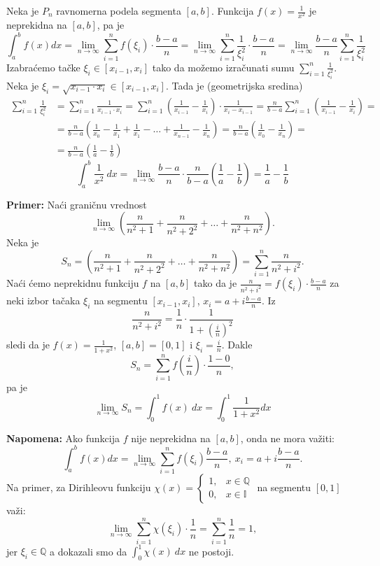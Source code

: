 \documentclass[a4paper,12pt,twoside]{report}
\numberwithin{algorithm}{section}
\begin{document}
Neka je \(P_n\) ravnomerna podela segmenta \([a, b]\).
Funkcija \(f(x) = \frac{1}{x^2}\) je neprekidna na \([a, b]\), pa je
\[
    \int_a^b f(x) dx = \lim_{n \to \infty} \sum_{i=1}^n f(\xi_i) \cdot \frac{b-a}{n} = \lim_{n \to \infty} \sum_{i=1}^n \frac{1}{\xi_i^2} \cdot \frac{b-a}{n} = \lim_{n \to \infty} \frac{b-a}{n} \sum_{i=1}^n \frac{1}{\xi_i^2}
\]
Izabraćemo tačke \(\xi_i \in [x_{i-1}, x_i]\) tako da možemo izračunati sumu \(\sum_{i=1}^n \frac{1}{\xi_i^2}\). Neka je \(\xi_i = \sqrt{x_{i-1} \cdot x_i} \in [x_{i-1}, x_i]\). Tada je (geometrijska sredina)
\begin{align*}
    \sum_{i=1}^n \frac{1}{\xi_i^2} &= \sum_{i=1}^n \frac{1}{x_{i-1} \cdot x_i} = \sum_{i=1}^n \left(\frac{1}{x_{i-1}} - \frac{1}{x_i}\right) \cdot \frac{1}{x_i - x_{i-1}} = \frac{n}{b-a} \sum_{i=1}^n \left(\frac{1}{x_{i-1}} - \frac{1}{x_i}\right) = \\
    &= \frac{n}{b-a} \left( \frac{1}{x_0} - \frac{1}{x_1} + \frac{1}{x_1} - \dots + \frac{1}{x_{n-1}} - \frac{1}{x_n} \right) = \frac{n}{b-a} \left( \frac{1}{x_0} - \frac{1}{x_n} \right) = \\
    &= \frac{n}{b-a} \left( \frac{1}{a} - \frac{1}{b} \right)
\end{align*}
\[
    \int_a^b \frac{1}{x^2} \ dx = \lim_{n \to \infty} \frac{b-a}{n} \cdot \frac{n}{b-a} \left( \frac{1}{a} - \frac{1}{b} \right) = \frac{1}{a} - \frac{1}{b}
\]

\noindent\textbf{Primer:} Naći graničnu vrednost
\[
    \lim_{n \to \infty} \left( \frac{n}{n^2+1} + \frac{n}{n^2+2^2} + \dots + \frac{n}{n^2+n^2} \right).
\]
Neka je \[S_n = \left( \frac{n}{n^2+1} + \frac{n}{n^2+2^2} + \dots + \frac{n}{n^2+n^2} \right) = \sum_{i=1}^n \frac{n}{n^2+i^2}.\]
Naći ćemo neprekidnu funkciju \(f\) na \([a, b]\) tako da je \(\frac{n}{n^2+i^2} = f(\xi_i) \cdot \frac{b-a}{n}\) za neki izbor tačaka \(\xi_i\) na segmentu \([x_{i-1}, x_i]\), \(x_i = a + i \frac{b-a}{n}\).
Iz \[\frac{n}{n^2+i^2} = \frac{1}{n} \cdot \frac{1}{1 + (\frac{i}{n})^2}\] sledi da je \(f(x) = \frac{1}{1+x^2}\), \([a, b] = [0, 1]\) i \(\xi_i = \frac{i}{n}\). Dakle \[S_n = \sum_{i=1}^n f\left(\frac{i}{n}\right) \cdot \frac{1-0}{n},\] pa je
\[
    \lim_{n \to \infty} S_n = \int_0^1 f(x) \ dx = \int_0^1 \frac{1}{1+x^2} dx
\]

\noindent\textbf{Napomena:} Ako funkcija \(f\) nije neprekidna na \([a, b]\), onda ne mora važiti: \[\int_a^b f(x) dx = \lim_{n \to \infty} \sum_{i=1}^n f(\xi_i) \frac{b-a}{n}, \ x_i = a + i \frac{b-a}{n}.\]
Na primer, za Dirihleovu funkciju \(\chi(x) = \begin{cases} 1, & x \in \mathbb{Q} \\ 0, & x \in \mathbb{I} \end{cases}\) na segmentu \([0, 1]\) važi: \[\lim_{n \to \infty} \sum_{i=1}^n \chi(\xi_i) \cdot \frac{1}{n} = \sum_{i=1}^n \frac{1}{n} = 1,\] jer \(\xi_i \in \mathbb{Q}\)
a dokazali smo da \(\int_0^1 \chi(x) \ dx\) ne postoji.
\end{document}
